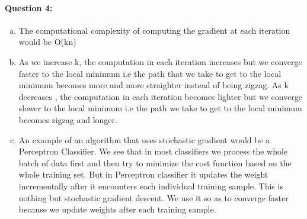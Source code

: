 \documentclass[letterpaper,11pt]{article}
\begin{document}
\paragraph{Question 4:}
\begin{enumerate}[(a)]
\item
The computational complexity of computing the gradient at each iteration would be O(kn)
\bigskip
\item
As we increase k, the computation in each iteration increases but we converge faster to the local minimum i.e the path that we take to get to the local minimum becomes more and more straighter instead of being zigzag.
As k decreases , the computation in each iteration becomes lighter but we converge slower to the local minimum i.e the path we take to get to the local minimum becomes zigzag and longer.

\bigskip
\item
An example of an algorithm that uses stochastic gradient would be a Perceptron Classifier.
We see that in most classifiers we process the whole batch of data first and then try to minimize the cost function based on the whole training set. But in Perceptron classifier it updates the weight incrementally after it encounters each individual training sample. This is nothing but stochastic gradient descent.
We use it so as to converge faster because we update weights after each training sample.

\end{enumerate}
\end{document}
